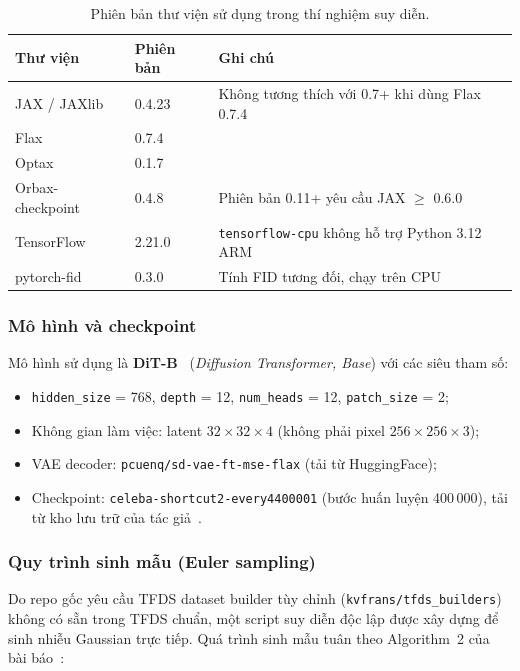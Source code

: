 \begin{table}[h]
\centering
\caption{Phiên bản thư viện sử dụng trong thí nghiệm suy diễn.}
\label{tab:env}
\begin{tabular}{lll}
\toprule
\textbf{Thư viện} & \textbf{Phiên bản} & \textbf{Ghi chú} \\
\midrule
JAX / JAXlib     & 0.4.23 & Không tương thích với 0.7+ khi dùng Flax 0.7.4 \\
Flax             & 0.7.4  & \\
Optax            & 0.1.7  & \\
Orbax-checkpoint & 0.4.8  & Phiên bản 0.11+ yêu cầu JAX $\geq$ 0.6.0 \\
TensorFlow       & 2.21.0 & \texttt{tensorflow-cpu} không hỗ trợ Python 3.12 ARM \\
pytorch-fid      & 0.3.0  & Tính FID tương đối, chạy trên CPU \\
\bottomrule
\end{tabular}
\end{table}

\subsubsection{Mô hình và checkpoint}

Mô hình sử dụng là \textbf{DiT-B}~\cite{peebles2023scalable} (\textit{Diffusion Transformer, Base}) với các siêu tham số:
\begin{itemize}
    \item \texttt{hidden\_size} = 768, \texttt{depth} = 12, \texttt{num\_heads} = 12, \texttt{patch\_size} = 2;
    \item Không gian làm việc: latent $32 \times 32 \times 4$ (không phải pixel $256 \times 256 \times 3$);
    \item VAE decoder: \texttt{pcuenq/sd-vae-ft-mse-flax} (tải từ HuggingFace);
    \item Checkpoint: \texttt{celeba-shortcut2-every4400001} (bước huấn luyện 400\,000), tải từ kho lưu trữ của tác giả~\cite{Frans2025}.
\end{itemize}

\subsubsection{Quy trình sinh mẫu (Euler sampling)}

Do repo gốc yêu cầu TFDS dataset builder tùy chỉnh (\texttt{kvfrans/tfds\_builders}) không có sẵn trong TFDS chuẩn, một script suy diễn độc lập được xây dựng để sinh nhiễu Gaussian trực tiếp. Quá trình sinh mẫu tuân theo Algorithm~2 của bài báo~\cite{Frans2025}:


